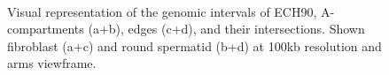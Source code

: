 \documentclass[
  11pt,
  a4paper,
]{scrbook}
\begin{document}
\begin{figure}
\begin{minipage}{0.40\linewidth}
{}


\end{minipage}%
%
\begin{minipage}{0.40\linewidth}



\end{minipage}%
%
\begin{minipage}{0.10\linewidth}
~\end{minipage}%

\caption{\label{fig-comps-edges-ech}Visual representation of the genomic
intervals of ECH90, A-compartments (a+b), edges (c+d), and their
intersections. Shown fibroblast (a+c) and round spermatid (b+d) at 100kb
resolution and arms viewframe.}

\end{figure}%
\end{document}
